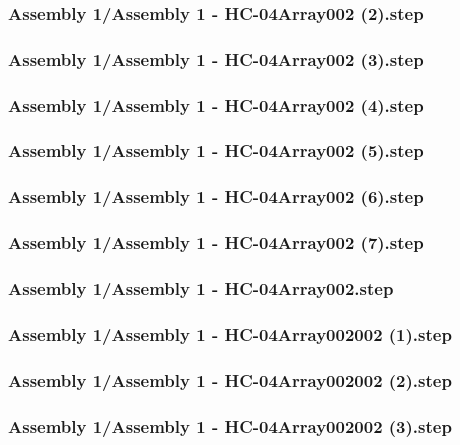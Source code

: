 \documentclass[a4paper,12pt]{article}
\begin{document}
\begin{lstlising}[language=C++]
\subsubsection{Assembly 1/Assembly 1 - HC-04Array002 (2).step}

\subsubsection{Assembly 1/Assembly 1 - HC-04Array002 (3).step}

\subsubsection{Assembly 1/Assembly 1 - HC-04Array002 (4).step}

\subsubsection{Assembly 1/Assembly 1 - HC-04Array002 (5).step}

\subsubsection{Assembly 1/Assembly 1 - HC-04Array002 (6).step}

\subsubsection{Assembly 1/Assembly 1 - HC-04Array002 (7).step}

\subsubsection{Assembly 1/Assembly 1 - HC-04Array002.step}

\subsubsection{Assembly 1/Assembly 1 - HC-04Array002002 (1).step}

\subsubsection{Assembly 1/Assembly 1 - HC-04Array002002 (2).step}

\subsubsection{Assembly 1/Assembly 1 - HC-04Array002002 (3).step}


\end{lstlising}
\end{document}
